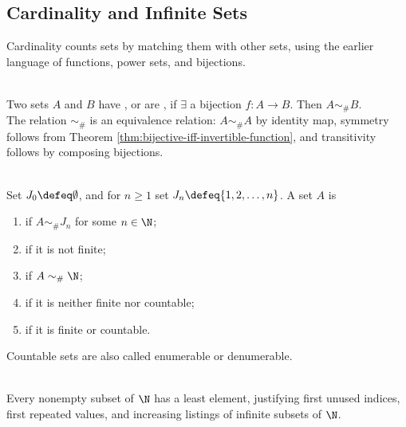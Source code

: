 \subsection{Cardinality and Infinite Sets}

%


Cardinality counts sets by matching them with other sets, using the earlier language of functions, power sets, and bijections.

\begin{definition} \label{def:cardinality-equivalence} \\
Two sets $A$ and $B$ have , or are , if $\exists$ a bijection $f:A\to B$. Then $A\sim_{\#}B$.\\
The relation $\sim_{\#}$ is an equivalence relation: $A\sim_{\#}A$ by identity map, symmetry follows from Theorem \ref{thm:bijective-iff-invertible-function}, and transitivity follows by composing bijections.
\end{definition}

\begin{definition} \label{def:finite-countable-uncountable}\label{def:cardinality-core-definitions-source-todo} \\
Set $J_0\defeq\emptyset$, and for $n\geq1$ set $J_n\defeq\{1,2,\ldots,n\}$. A set $A$ is
\begin{enumerate}[label=(\roman*)]
\setlength{\itemsep}{0pt}
\item {} if $A\sim_{\#} J_n$ for some $n\in\N$;
\item {} if it is not finite;
\item {} if $A\sim_{\#} \N$;
\item {} if it is neither finite nor countable;
\item {} if it is finite or countable.
\end{enumerate}
Countable sets are also called enumerable or denumerable.
\end{definition}

\begin{principle} \label{princ:well-ordering-natural-numbers} \\
Every nonempty subset of $\N$ has a least element, justifying first unused indices, first repeated values, and increasing listings of infinite subsets of $\N$.
\end{principle}


